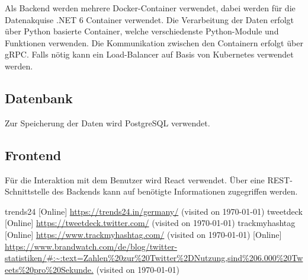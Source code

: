 \documentclass[conference]{IEEEtran}
\begin{document}
Als Backend werden mehrere Docker-Container verwendet, dabei werden für die Datenakquise .NET 6 Container verwendet. Die Verarbeitung der Daten erfolgt über Python basierte Container, welche verschiedenste Python-Module und Funktionen verwenden.
Die Kommunikation zwischen den Containern erfolgt über gRPC.
Falls nötig kann ein Load-Balancer auf Basis von Kubernetes verwendet werden. 

\subsection*{Datenbank}
Zur Speicherung der Daten wird PostgreSQL verwendet.

\subsection*{Frontend}

Für die Interaktion mit dem Benutzer wird React verwendet.
Über eine REST-Schnittstelle des Backends kann auf benötigte Informationen zugegriffen werden.


\begin{thebibliography}{0}
        trends24 [Online] \url{https://trends24.in/germany/} (visited on \today)
        tweetdeck [Online] \url{https://tweetdeck.twitter.com/} (visited on \today)
        trackmyhashtag [Online] \url{https://www.trackmyhashtag.com/} (visited on \today)
         [Online] \url{https://www.brandwatch.com/de/blog/twitter-statistiken/#:~:text=Zahlen%20zur%20Twitter%2DNutzung,sind%206.000%20Tweets%20pro%20Sekunde.} (visited on \today)
\end{thebibliography}
\vspace{12pt}
\end{document}
